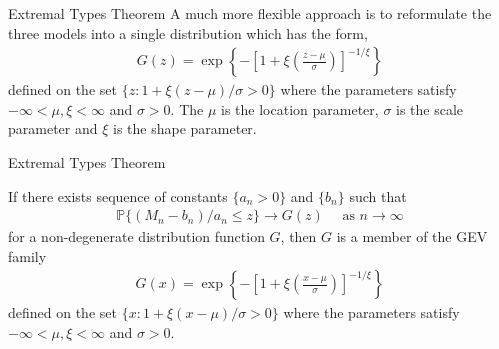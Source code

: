 \documentclass[10pt]{beamer}
\begin{document}

\begin{frame}{Extremal Types Theorem}
A much more flexible approach is to reformulate the three models into a single distribution which has the form,
\begin{align}\label{eq:gev}
G(z) = \exp \left\{-\left[1+\xi\left(\frac{z-\mu}{\sigma}\right)\right]^{-1/\xi}\right\}
\end{align}
defined on the set $\{z : 1 + \xi(z-\mu)/\sigma>0\}$ where the parameters satisfy $-\infty<\mu, \xi<\infty$ and $\sigma >0$. The $\mu$ is the location parameter, $\sigma$ is the scale parameter and $\xi$ is the shape parameter.

\end{frame}

\begin{frame}{Extremal Types Theorem}
\begin{theorem}\label{thm:gev}
If there exists sequence of constants $\{a_n>0\}$ and $\{b_n\}$ such that 
\begin{align}\label{eq:gevlimit}
\mathbb{P}\{(M_n - b_n)/a_n\leq z\} \to G(z) \quad\text{ as } n \to \infty
\end{align}
for a non-degenerate distribution function $G$, then $G$ is a member of the GEV family
\begin{align}
G(x) = \exp \left\{-\left[1+\xi\left(\frac{x-\mu}{\sigma}\right)\right]^{-1/\xi}\right\}
\end{align}
defined on the set $\{x : 1 + \xi(x-\mu)/\sigma>0\}$ where the parameters satisfy $-\infty<\mu, \xi<\infty$ and $\sigma >0$.
\end{theorem}
\end{frame}
\end{document}

